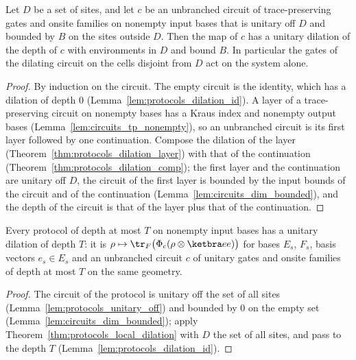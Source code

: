 \begin{theorem}
    \label{thm:protocols_local_dilation}
    \leanok
    Let $D$ be a set of sites, and let $c$ be an unbranched circuit of trace-preserving gates
    and onsite families on nonempty input bases that is unitary off $D$ and bounded by $B$ on
    the sites outside $D$. Then the map of $c$ has a unitary dilation of the depth of $c$ with
    environments in $D$ and bound $B$. In particular the
    gates of the dilating circuit on the cells disjoint from $D$ act on the system alone.
\end{theorem}
\begin{proof}\leanok
    By induction on the circuit. The empty circuit is the identity, which has a dilation of
    depth $0$ (Lemma~\ref{lem:protocols_dilation_id}). A layer of a trace-preserving circuit on
    nonempty bases has a Kraus index and nonempty output bases (Lemma~\ref{lem:circuits_tp_nonempty}), so an
    unbranched circuit is its first layer followed by one continuation. Compose the dilation of
    the layer (Theorem~\ref{thm:protocols_dilation_layer}) with that of the continuation
    (Theorem~\ref{thm:protocols_dilation_comp}); the first layer and the continuation are
    unitary off $D$, the circuit of the first layer is bounded by the input bounds of the
    circuit and of the continuation (Lemma~\ref{lem:circuits_dim_bounded}), and the depth of the circuit is that of the layer plus that of the
    continuation.
\end{proof}

\begin{theorem}
    \label{thm:protocols_dilation}
    \leanok
    Every protocol of depth at most $T$ on nonempty input bases has a unitary dilation of
    depth $T$: it is $\rho\mapsto\tr_F\bigl(\Phi_c(\rho\otimes\ketbra ee)\bigr)$ for bases
    $E_s$, $F_s$, basis vectors $e_s\in E_s$ and an unbranched circuit $c$ of unitary gates and
    onsite families of depth at most $T$ on the same geometry.
\end{theorem}
\begin{proof}\leanok
    The circuit of the protocol is unitary off the set of all sites
    (Lemma~\ref{lem:protocols_unitary_off}) and bounded by $0$ on the empty set
    (Lemma~\ref{lem:circuits_dim_bounded}); apply
    Theorem~\ref{thm:protocols_local_dilation} with $D$ the set of all sites, and pass to the
    depth $T$ (Lemma~\ref{lem:protocols_dilation_id}).
\end{proof}

